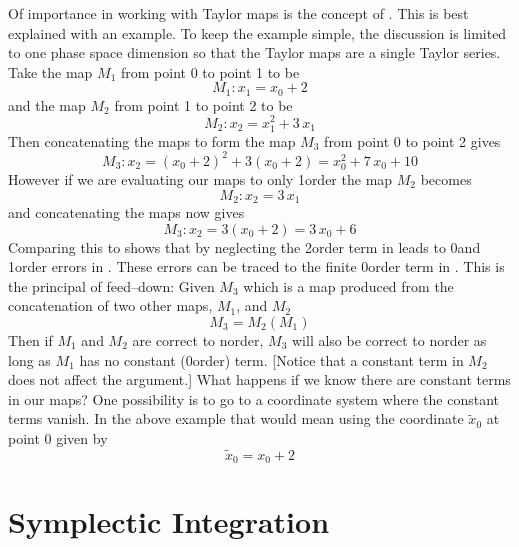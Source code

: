 Of importance in working with Taylor maps is the concept of
.  This is best explained with an example. To keep the
example simple, the discussion is limited to one phase space
dimension so that the Taylor maps are a single Taylor series. Take the
map $M_1$ from point 0 to point 1 to be
\begin{equation}
  M_1: x_1 = x_0 + 2
  \label{xx2}
\end{equation}
and the map $M_2$ from point 1 to point 2 to be
\begin{equation}
  M_2: x_2 = x_1^2 + 3 \, x_1
  \label{xx3x}
\end{equation}
Then concatenating the maps to form the map $M_3$ from point 0 to point 2
gives
\begin{equation}
  M_3: x_2 = (x_0 + 2)^2 + 3 (x_0 + 2) = x_0^2 + 7 \, x_0 + 10
  \label{xx23x2}
\end{equation}
However if we are evaluating our maps to only 1\St order the map $M_2$
becomes
\begin{equation}
  M_2: x_2 = 3 \, x_1
\end{equation}
and concatenating the maps now gives
\begin{equation}
  M_3: x_2 = 3 (x_0 + 2) = 3 \, x_0 + 6
  \label{x3x23}
\end{equation}
Comparing this to  shows that by neglecting the 2\Nd order
term in  leads to 0\Th and 1\St order errors in
. These errors can be traced to the finite 0\Th order term in
. This is the principal of feed--down: Given $M_3$ which is a map
produced from the concatenation of two other maps, $M_1$, and $M_2$
\begin{equation}
  M_3 = M_2(M_1)
\end{equation}
Then if $M_1$ and $M_2$ are correct to n\Th order, $M_3$ will also be
correct to n\Th order as long as $M_1$ has no constant (0\Th order)
term. [Notice that a constant term in $M_2$ does not affect the
argument.]  What happens if we know there are constant terms in our
maps? One possibility is to go to a coordinate system where the
constant terms vanish. In the above example that would mean using the
coordinate $\widetilde x_0$ at point 0 given by
\begin{equation}
  \widetilde x_0 = x_0 + 2
\end{equation}

\section{Symplectic Integration}
\label{s:symp.integ}

